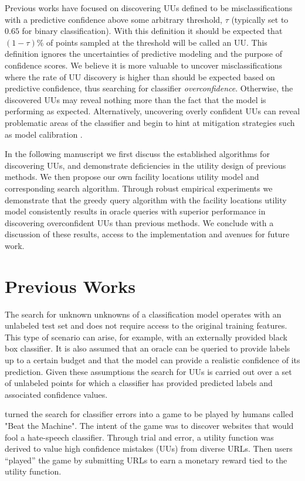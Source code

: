 \documentclass[letterpaper]{article} %
\begin{document}
Previous works have focused on discovering UUs defined to be misclassifications with a predictive confidence above some arbitrary threshold, $\tau$ (typically set to $0.65$ for binary classification).  With this definition it should be expected that $(1-\tau)$\% of points sampled at the threshold will be called an UU. This definition ignores the uncertainties of predictive modeling and the purpose of confidence scores.  We believe it is more valuable to uncover misclassifications where the rate of UU discovery is higher than should be expected based on predictive confidence, thus searching for classifier \textit{overconfidence}. Otherwise, the discovered UUs may reveal nothing more than the fact that the model is performing as expected.  Alternatively, uncovering overly confident UUs can reveal problematic areas of the classifier and begin to hint at mitigation strategies such as model calibration \citep{bella2010calibration}.  

In the following manuscript we first discuss the established algorithms for discovering UUs, and demonstrate deficiencies in the utility design of previous methods. We then propose our own facility locations utility model and corresponding search algorithm. Through robust empirical experiments we demonstrate that the greedy query algorithm with the facility locations utility model consistently results in oracle queries with superior performance in discovering overconfident UUs than previous methods. We conclude with a discussion of these results, access to the implementation and avenues for future work.

\section{Previous Works}

The search for unknown unknowns of a classification model operates with an unlabeled test set and does not require access to the original training features. This type of scenario can arise, for example, with an externally provided black box classifier.  It is also assumed that an oracle can be queried to provide labels up to a certain budget and that the model can provide a realistic confidence of its prediction. Given these assumptions the search for UUs is carried out over a set of unlabeled points for which a classifier has provided predicted labels and associated confidence values.  

\citet{Attenberg2015} turned the search for classifier errors into a game to be played by humans called "Beat the Machine". The intent of the game was to discover websites that would fool a hate-speech classifier. Through trial and error, a utility function was derived to value high confidence mistakes (UUs) from diverse URLs. Then users ``played'' the game by submitting URLs to earn a monetary reward tied to the utility function. 
\end{document}
